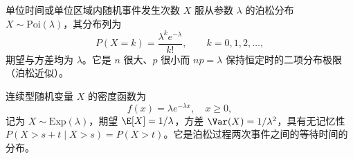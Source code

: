 \documentclass[12pt]{article}
\begin{document}
\begin{defn}
  单位时间或单位区域内随机事件发生次数 $X$ 服从参数 $\lambda$ 的泊松分布 $X\sim \mathrm{Poi}(\lambda)$，其分布列为
  \[
    P(X=k)=\frac{\lambda^k e^{-\lambda}}{k!},\qquad k=0,1,2,\dots,
  \]
  期望与方差均为 $\lambda$。它是 $n$ 很大、$p$ 很小而 $np=\lambda$ 保持恒定时的二项分布极限（泊松近似）。
\end{defn}

\begin{defn}
  连续型随机变量 $X$ 的密度函数为
  \[
    f(x)=\lambda e^{-\lambda x},\quad x\ge 0,
  \]
  记为 $X\sim \mathrm{Exp}(\lambda)$，期望 $\E[X]=1/\lambda$，方差 $\Var(X)=1/\lambda^2$，具有无记忆性 $P(X>s+t\mid X>s)=P(X>t)$。它是泊松过程两次事件之间的等待时间的分布。
\end{defn}
\end{document}
